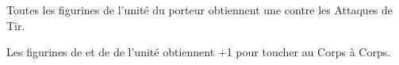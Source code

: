 \startpricelist

 Toutes les figurines de l'unité du porteur obtiennent une  contre les Attaques de Tir. 

 Les figurines de \barrowknights{} et de \barrowguards{} de l'unité obtiennent +1 pour toucher au Corps à Corps.

\endpricelist

\closearmymagicalitems








\quickrefsheettitle


\bigskip
\begin{center}\end{center}

\newcommand{\QRSinvoctable}[2]{%
\rowcolors{1}{white}{black!10}
\noindent\begin{tabular}{p{4cm}>{\centering\let\newline\\\arraybackslash\hspace{0pt}}p{1cm}@{}}%
\antiquefont\Large{\textbf{#1\spacebeforecolon{}:}}&\vspace*{-0.2cm}%
\DTLforeach*[#2]{profiles}{\rowname=name, \rowtrooptype=trooptype, \rowcategory=category, \rowinvocation=invocation}{%
\tabularnewline\rowname{} & \rowinvocation{}}%
\tabularnewline%
\end{tabular}
\medskip
}

